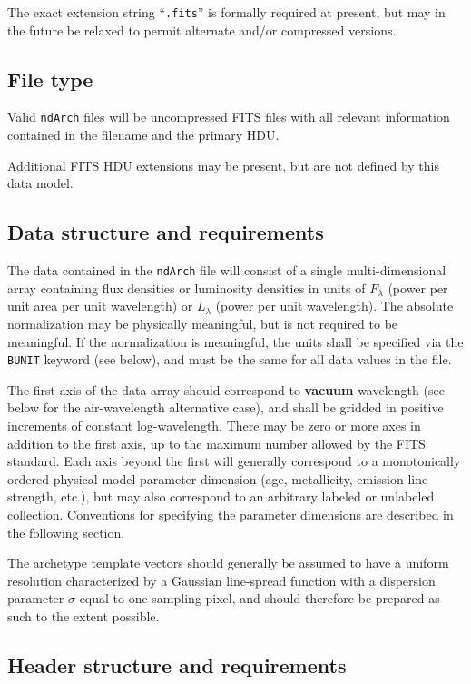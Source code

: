\documentclass[12pt]{article}
\begin{document}
The exact extension string ``\texttt{.fits}'' is formally required at present,
but may in the future be relaxed to permit alternate and/or
compressed versions.

\subsection{File type}

Valid \texttt{ndArch} files will be uncompressed FITS
files with all relevant information contained in the
filename and the primary HDU\@.

Additional FITS HDU extensions may be present, but are not defined
by this data model.

\subsection{Data structure and requirements}

The data contained in the \texttt{ndArch} file
will consist of a single multi-dimensional array
containing flux densities or luminosity densities in units of
$F_{\lambda}$ (power per unit area per unit wavelength) or $L_{\lambda}$
(power per unit wavelength).
The absolute normalization may be physically
meaningful, but is not required to be meaningful.
If the normalization is meaningful, the units
shall be specified via the \texttt{BUNIT} keyword (see below),
and must be the same for all data values in the file.

The first axis of the data array should correspond to \textbf{vacuum}
wavelength (see below for the air-wavelength alternative case),
and shall be gridded in positive increments of constant
log-wavelength.  There may be zero or more axes in addition
to the first axis, up to the maximum number allowed by
the FITS standard.  Each axis beyond the first will generally correspond
to a monotonically ordered
physical model-parameter dimension (age, metallicity,
emission-line strength, etc.), but may also correspond to
an arbitrary labeled or unlabeled collection.
Conventions for specifying the parameter dimensions are
described in the following section.

The archetype template vectors should generally be assumed to have
a uniform resolution characterized by a Gaussian
line-spread function with a dispersion parameter
$\sigma$ equal to one sampling pixel, and should therefore be
prepared as such to the extent possible.

\subsection{Header structure and requirements}
\end{document}
